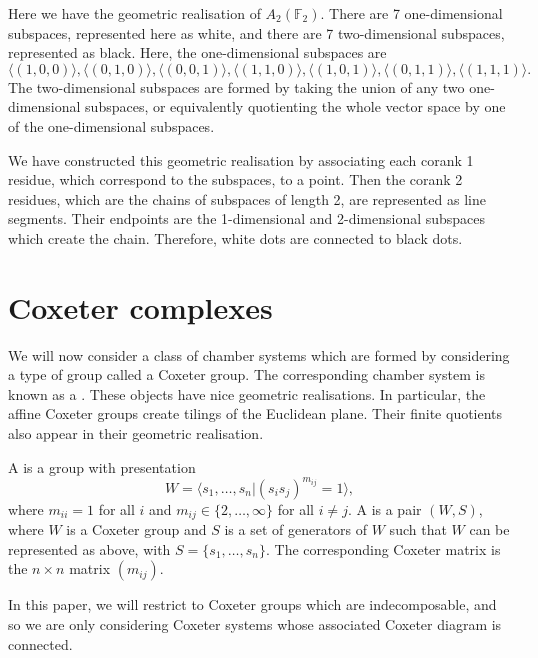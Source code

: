 \documentclass[11pt]{article}
\begin{document}
\begin{example} \label{AnK}
    Here we have the geometric realisation of $A_2(\mathbb{F}_2)$. There are 7 one-dimensional subspaces, represented here as white, and there are 7 two-dimensional subspaces, represented as black. Here, the one-dimensional subspaces are
    \[\langle (1,0,0)\rangle, \langle (0,1,0)\rangle,\langle (0,0,1)\rangle,\langle (1,1,0)\rangle,\langle (1,0,1)\rangle,\langle (0,1,1)\rangle,\langle (1,1,1)\rangle.\]
    The two-dimensional subspaces are formed by taking the union of any two one-dimensional subspaces, or equivalently quotienting the whole vector space by one of the one-dimensional subspaces. 

    We have constructed this geometric realisation by associating each corank 1 residue, which correspond to the subspaces, to a point. Then the corank 2 residues, which are the chains of subspaces of length 2, are represented as line segments. Their endpoints are the 1-dimensional and 2-dimensional subspaces which create the chain. Therefore, white dots are connected to black dots.
\end{example}

\section{Coxeter complexes}

We will now consider a class of chamber systems which are formed by considering a type of group called a Coxeter group. The corresponding chamber system is known as a . These objects have nice geometric realisations. In particular, the affine Coxeter groups create tilings of the Euclidean plane. Their finite quotients also appear in their geometric realisation. 

\begin{definition}
    A  is a group with presentation
    \[W=\langle s_1,\hdots , s_n |(s_is_j)^{m_{ij}}=1\rangle,\]
    where $m_{ii}=1$ for all $i$ and $m_{ij}\in \{2,\hdots ,\infty\}$ for all $i\neq j$. 
    A  is a pair $(W,S)$, where $W$ is a Coxeter group and $S$ is a set of generators of $W$ such that $W$ can be represented as above, with $S=\{s_1,\hdots,s_n\}$. The corresponding Coxeter matrix is the $n\times n$ matrix $(m_{ij})$. 
\end{definition}

In this paper, we will restrict to Coxeter groups which are indecomposable, and so we are only considering Coxeter systems whose associated Coxeter diagram is connected. 
\end{document}

